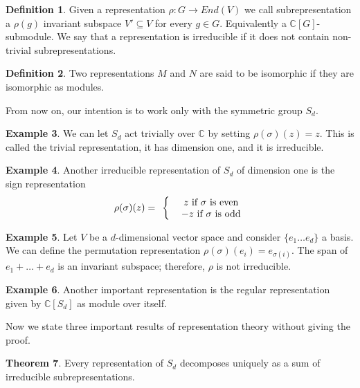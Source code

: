 \documentclass[12pt,a4paper,openright,twoside]{report}
\theoremstyle{definition} %
\newtheorem{theorem}{Theorem}[chapter]
\newtheorem{definition}[theorem]{Definition}
\newtheorem{example}[theorem]{Example}
\def \C {\mathbb{C}}
\begin{document}
\begin{definition}
    Given a representation \(\rho:G \to End(V)\) we call subrepresentation a \(\rho(g)\) invariant subspace \(V' \subseteq V\) for every \(g \in G\). Equivalently a \(\C[G]\)-submodule.
    We say that a representation is irreducible if it does not contain non-trivial subrepresentations.
\end{definition}

\begin{definition}
    Two representations \(M\) and \(N\) are said to be isomorphic if they are isomorphic as modules.
\end{definition}

From now on, our intention is to work only with the symmetric group \(S_d\).

\begin{example}
    We can let \(S_d\) act trivially over \(\C\) by setting \(\rho(\sigma)(z) = z\). This is called the trivial representation, it has dimension one, and it is irreducible.
\end{example}

\begin{example}
    Another irreducible representation of \(S_d\) of dimension one is the sign representation
    \[
        \parbox{2cm}{\centering \(\rho(\sigma)(z) = \)}
        \biggl\{
        \parbox{3cm}{\centering \(z\) if \(\sigma\) is even\\
        \(-z\) if \(\sigma\) is odd}
    \]
\end{example}

\begin{example}
    Let \(V\) be a \(d\)-dimensional vector space and consider \(\{e_1 \ldots e_d\}\) a basis. We can define the permutation representation \(\rho(\sigma)(e_i)=e_{\sigma(i)}\).
    The span of \(e_1 + \ldots + e_d\) is an invariant subspace; therefore, \(\rho\) is not irreducible.
\end{example}

\begin{example}
    Another important representation is the regular representation given by \(\C[S_d]\) as module over itself.
\end{example}

Now we state three important results of representation theory without giving the proof.

\begin{theorem}
    Every representation of \(S_d\) decomposes uniquely as a sum of irreducible subrepresentations.
\end{theorem}
\end{document}
